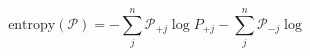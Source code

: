 \begin{equation}
\text{entropy}(\mathcal P) = -\sum_j^n\mathcal P_{+j}\log P_{+j} -\sum_j^n\mathcal P_{-j}\log
\end{equation}